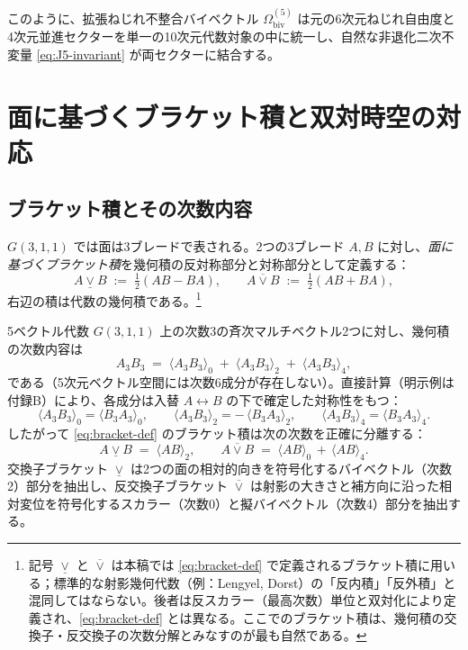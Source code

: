 \documentclass[11pt,a4paper]{article}
\begin{document}
このように、拡張ねじれ不整合バイベクトル $\Omega_{\text{biv}}^{(5)}$ は元の6次元ねじれ自由度と4次元並進セクターを単一の10次元代数対象の中に統一し、自然な非退化二次不変量 \eqref{eq:J5-invariant} が両セクターに結合する。

\section{面に基づくブラケット積と双対時空の対応}

\subsection{ブラケット積とその次数内容}

$G(3,1,1)$ では面は3ブレードで表される。2つの3ブレード $A,B$ に対し、\emph{面に基づくブラケット積}を幾何積の反対称部分と対称部分として定義する：
\begin{equation}
A \mathbin{\underline{\vee}} B \;:=\; \tfrac{1}{2}(AB - BA),
\qquad
A \mathbin{\overline{\vee}} B \;:=\; \tfrac{1}{2}(AB + BA),
\label{eq:bracket-def}
\end{equation}
右辺の積は代数の幾何積である。\footnote{記号 $\underline{\vee}$ と $\overline{\vee}$ は本稿では \eqref{eq:bracket-def} で定義されるブラケット積に用いる；標準的な射影幾何代数（例：Lengyel, Dorst）の「反内積」「反外積」と混同してはならない。後者は反スカラー（最高次数）単位と双対化により定義され、\eqref{eq:bracket-def} とは異なる。ここでのブラケット積は、幾何積の交換子・反交換子の次数分解とみなすのが最も自然である。}

5ベクトル代数 $G(3,1,1)$ 上の次数3の斉次マルチベクトル2つに対し、幾何積の次数内容は
\[
A_{3}B_{3} \;=\; \langle A_{3}B_{3}\rangle_{0} \;+\; \langle A_{3}B_{3}\rangle_{2} \;+\; \langle A_{3}B_{3}\rangle_{4},
\]
である（5次元ベクトル空間には次数6成分が存在しない）。直接計算（明示例は付録B）により、各成分は入替 $A\leftrightarrow B$ の下で確定した対称性をもつ：
\[
\langle A_{3}B_{3}\rangle_{0} = \langle B_{3}A_{3}\rangle_{0},
\qquad
\langle A_{3}B_{3}\rangle_{2} = -\,\langle B_{3}A_{3}\rangle_{2},
\qquad
\langle A_{3}B_{3}\rangle_{4} = \langle B_{3}A_{3}\rangle_{4}.
\]
したがって \eqref{eq:bracket-def} のブラケット積は次の次数を正確に分離する：
\begin{equation}
A \mathbin{\underline{\vee}} B \;=\; \langle AB\rangle_{2},
\qquad
A \mathbin{\overline{\vee}} B \;=\; \langle AB\rangle_{0} \,+\, \langle AB\rangle_{4}.
\label{eq:bracket-grades}
\end{equation}
交換子ブラケット $\mathbin{\underline{\vee}}$ は2つの面の相対的向きを符号化するバイベクトル（次数2）部分を抽出し、反交換子ブラケット $\mathbin{\overline{\vee}}$ は射影の大きさと補方向に沿った相対変位を符号化するスカラー（次数0）と擬バイベクトル（次数4）部分を抽出する。
\end{document}
